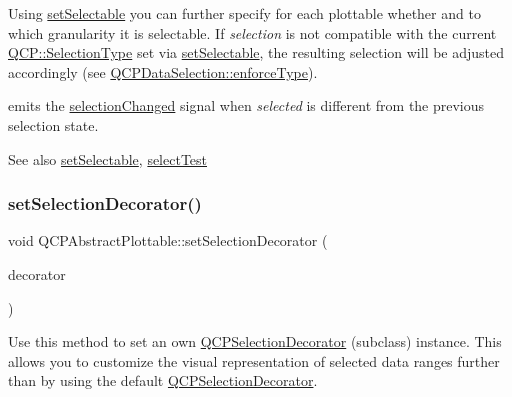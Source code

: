 Using \mbox{\hyperlink{class_q_c_p_abstract_plottable_ac238d6e910f976f1f30d41c2bca44ac3}{set\+Selectable}} you can further specify for each plottable whether and to which granularity it is selectable. If {\itshape selection} is not compatible with the current \mbox{\hyperlink{namespace_q_c_p_ac6cb9db26a564b27feda362a438db038}{Q\+C\+P\+::\+Selection\+Type}} set via \mbox{\hyperlink{class_q_c_p_abstract_plottable_ac238d6e910f976f1f30d41c2bca44ac3}{set\+Selectable}}, the resulting selection will be adjusted accordingly (see \mbox{\hyperlink{class_q_c_p_data_selection_a17b84d852911531d229f4a76aa239a75}{Q\+C\+P\+Data\+Selection\+::enforce\+Type}}).

emits the \mbox{\hyperlink{class_q_c_p_abstract_plottable_a3af66432b1dca93b28e00e78a8c7c1d9}{selection\+Changed}} signal when {\itshape selected} is different from the previous selection state.

\begin{DoxySeeAlso}{See also}
\mbox{\hyperlink{class_q_c_p_abstract_plottable_ac238d6e910f976f1f30d41c2bca44ac3}{set\+Selectable}}, \mbox{\hyperlink{class_q_c_p_abstract_plottable_a38efe9641d972992a3d44204bc80ec1d}{select\+Test}} 
\end{DoxySeeAlso}
\mbox{\label{class_q_c_p_abstract_plottable_a20e266ad646f8c4a7e4631040510e5d9}} 
\subsubsection{\texorpdfstring{set\+Selection\+Decorator()}{setSelectionDecorator()}}
{\footnotesize\ttfamily void Q\+C\+P\+Abstract\+Plottable\+::set\+Selection\+Decorator (\begin{DoxyParamCaption}\item[{\mbox{\hyperlink{class_q_c_p_selection_decorator}{Q\+C\+P\+Selection\+Decorator}} $\ast$}]{decorator }\end{DoxyParamCaption})}

Use this method to set an own \mbox{\hyperlink{class_q_c_p_selection_decorator}{Q\+C\+P\+Selection\+Decorator}} (subclass) instance. This allows you to customize the visual representation of selected data ranges further than by using the default \mbox{\hyperlink{class_q_c_p_selection_decorator}{Q\+C\+P\+Selection\+Decorator}}.

